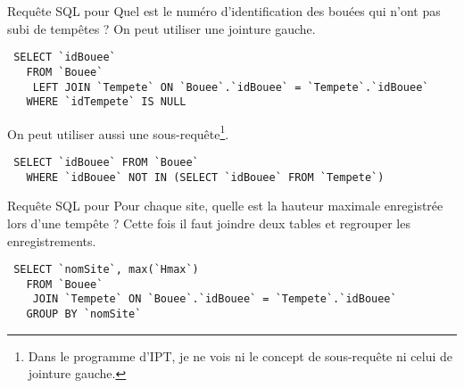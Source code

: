 Requête SQL pour \og Quel est le numéro d'identification des bouées qui n'ont pas subi de tempêtes ?\fg
On peut utiliser une jointure gauche.
\begin{verbatim}
 SELECT `idBouee` 
   FROM `Bouee` 
    LEFT JOIN `Tempete` ON `Bouee`.`idBouee` = `Tempete`.`idBouee`
   WHERE `idTempete` IS NULL
\end{verbatim}
On peut utiliser aussi une sous-requête\footnote{Dans le programme d'IPT, je ne vois ni le concept de sous-requête ni celui de jointure gauche.}.
\begin{verbatim}
 SELECT `idBouee` FROM `Bouee` 
   WHERE `idBouee` NOT IN (SELECT `idBouee` FROM `Tempete`)
\end{verbatim}

Requête SQL pour \og Pour chaque site, quelle est la hauteur maximale enregistrée lors d'une tempête ?\fg\newline
Cette fois il faut joindre deux tables et regrouper les enregistrements.
\begin{verbatim}
 SELECT `nomSite`, max(`Hmax`)
   FROM `Bouee` 
    JOIN `Tempete` ON `Bouee`.`idBouee` = `Tempete`.`idBouee` 
   GROUP BY `nomSite`
\end{verbatim}

